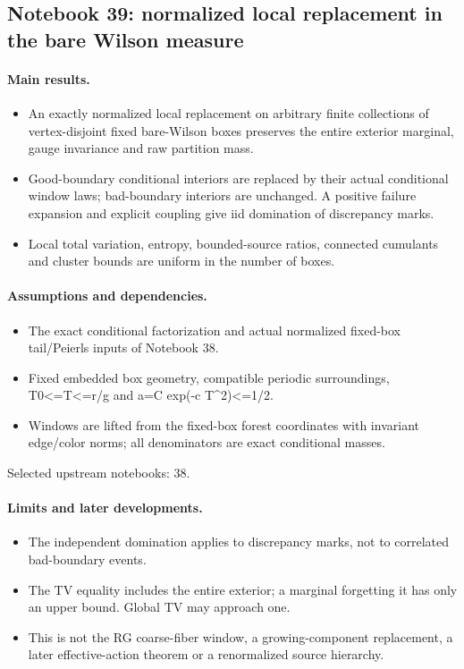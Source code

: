 \documentclass[11pt]{article}
\theoremstyle{remark}
\begin{document}
\subsection{Notebook 39: normalized local replacement in the bare Wilson measure}
\label{hnc-39}
\noindent{}\par

\paragraph{Main results.}
\begin{itemize}
\item An exactly normalized local replacement on arbitrary finite collections of vertex-disjoint fixed bare-Wilson boxes preserves the entire exterior marginal, gauge invariance and raw partition mass.
\item Good-boundary conditional interiors are replaced by their actual conditional window laws; bad-boundary interiors are unchanged. A positive failure expansion and explicit coupling give iid domination of discrepancy marks.
\item Local total variation, entropy, bounded-source ratios, connected cumulants and cluster bounds are uniform in the number of boxes.
\end{itemize}

\paragraph{Assumptions and dependencies.}
\begin{itemize}
\item The exact conditional factorization and actual normalized fixed-box tail/Peierls inputs of Notebook 38.
\item Fixed embedded box geometry, compatible periodic surroundings, T0<=T<=r/g and a=C exp(-c T\textasciicircum{}2)<=1/2.
\item Windows are lifted from the fixed-box forest coordinates with invariant edge/color norms; all denominators are exact conditional masses.
\end{itemize}

Selected upstream notebooks: 38.\par

\paragraph{Limits and later developments.}
\begin{itemize}
\item The independent domination applies to discrepancy marks, not to correlated bad-boundary events.
\item The TV equality includes the entire exterior; a marginal forgetting it has only an upper bound. Global TV may approach one.
\item This is not the RG coarse-fiber window, a growing-component replacement, a later effective-action theorem or a renormalized source hierarchy.
\end{itemize}
\end{document}
